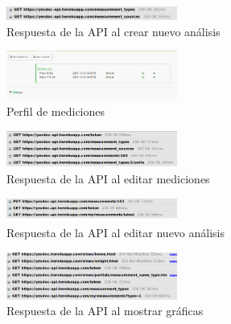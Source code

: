 \documentclass[a4paper,12pt]{article}
\begin{document}
    \begin{figure}[h]
        \centering
        \includegraphics[width=0.5\textwidth]{img/5-crear_medicion}
        \caption{Respuesta de la API al crear nuevo análisis}
		\label{5-crear_medicion}
    \end{figure}
    
    
    
    
    \begin{figure}[h]
        \centering
        \includegraphics[width=0.5\textwidth]{img/5-perfil_mediciones}
        \caption{Perfil de mediciones}
		\label{5-perfil_mediciones}
    \end{figure}
    
    \begin{figure}[h]
        \centering
        \includegraphics[width=0.5\textwidth]{img/5-editar_medicion}
        \caption{Respuesta de la API al editar mediciones}
		\label{5-editar_medicion}
    \end{figure}
    
    \begin{figure}[h]
        \centering
        \includegraphics[width=0.5\textwidth]{img/5-fin_editar_medicion}
        \caption{Respuesta de la API al editar nuevo análisis}
		\label{5-fin_editar_medicion}
    \end{figure}
    
    \begin{figure}[h]
        \centering
        \includegraphics[width=0.5\textwidth]{img/5-mostrar_grafica}
        \caption{Respuesta de la API al mostrar gráficas}
		\label{5-mostrar_grafica}
    \end{figure}
    
\end{document}
